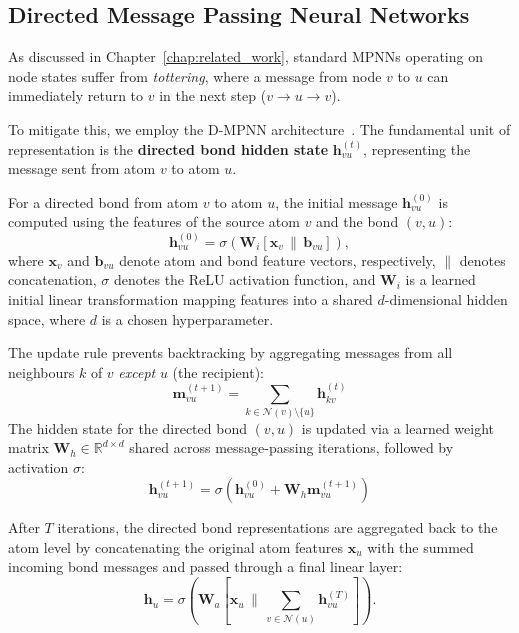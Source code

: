 \subsection{Directed Message Passing Neural Networks}
As discussed in Chapter~\ref{chap:related_work}, standard MPNNs operating on node states suffer from \textit{tottering}, where a message from node $v$ to $u$ can immediately return to $v$ in the next step ($v \to u \to v$). 

To mitigate this, we employ the D-MPNN architecture~\cite{yang2019analyzing}. The fundamental unit of representation is the \textbf{directed bond hidden state} $\mathbf{h}_{vu}^{(t)}$, representing the message sent from atom $v$ to atom $u$. 

For a directed bond from atom $v$ to atom $u$, the initial message $\mathbf{h}_{vu}^{(0)}$ is computed using the features of the source atom $v$ and the bond $(v,u)$:
\begin{equation}
\mathbf{h}_{vu}^{(0)} = \sigma(\mathbf{W}_i [\mathbf{x}_v \,\|\, \mathbf{b}_{vu}]),
\end{equation}
where $\mathbf{x}_v$ and $\mathbf{b}_{vu}$ denote atom and bond feature vectors, respectively, $\|$ denotes concatenation, $\sigma$ denotes the ReLU activation function, and $\mathbf{W}_i$ is a learned initial linear transformation mapping features into a shared $d$-dimensional hidden space, where $d$ is a chosen hyperparameter.

The update rule prevents backtracking by aggregating messages from all neighbours $k$ of $v$ \textit{except} $u$ (the recipient):
\begin{equation}
    \mathbf{m}_{vu}^{(t+1)} = \sum_{k \in \mathcal{N}(v) \setminus \{u\}} \mathbf{h}_{kv}^{(t)}
\end{equation}
The hidden state for the directed bond $(v,u)$ is updated via a learned weight matrix $\mathbf{W}_h \in \mathbb{R}^{d \times d}$ shared across message-passing iterations, followed by activation $\sigma$:
\begin{equation}
    \mathbf{h}_{vu}^{(t+1)} = 
    \sigma\left(
        \mathbf{h}_{vu}^{(0)} + 
        \mathbf{W}_h \mathbf{m}_{vu}^{(t+1)}
    \right)
\end{equation}

After $T$ iterations, the directed bond representations are aggregated back to the atom level by concatenating the original atom features $\mathbf{x}_u$ with the summed incoming bond messages and passed through a final linear layer:
\begin{equation}
\mathbf{h}_u = \sigma \!\left( \mathbf{W}_a \left[ \mathbf{x}_u \,\|\, \sum_{v \in \mathcal{N}(u)} \mathbf{h}_{vu}^{(T)} \right] \right).
\end{equation}

